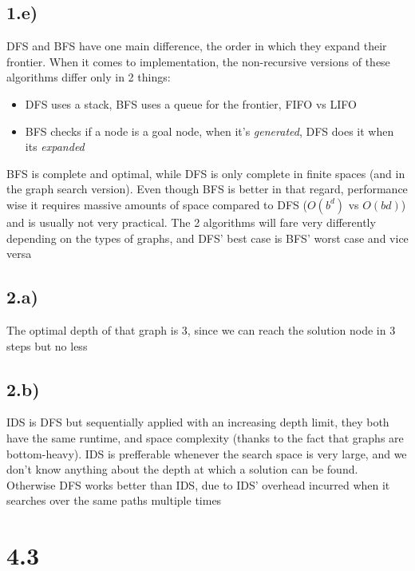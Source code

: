 \documentclass{report}
\begin{document}
\subsection*{1.e)}
DFS and BFS have one main difference, the order in which they expand their frontier. When it comes to implementation, the non-recursive versions of these algorithms differ only in 2 things: 
\begin{itemize}
    \item DFS uses a stack, BFS uses a queue for the frontier, FIFO vs LIFO
    \item BFS checks if a node is a goal node, when it's \emph{generated}, DFS does it when its \emph{expanded}
\end{itemize}
BFS is complete and optimal, while DFS is only complete in finite spaces (and in the graph search version).
Even though BFS is better in that regard, performance wise it requires massive amounts of space compared to DFS ($O(b^{d})$ vs $O(bd)$) and is usually not very practical. The 2 algorithms will fare very differently depending on the types of graphs, and DFS' best case is BFS' worst case and vice versa\par
\subsection*{2.a)}
The optimal depth of that graph is 3, since we can reach the solution node in 3 steps but no less
\subsection*{2.b)}
IDS is DFS but sequentially applied with an increasing depth limit, they both have the same runtime, and space complexity (thanks to the fact that graphs are bottom-heavy). IDS is prefferable whenever the search space is very large, and we don't know anything about the depth at which a solution can be found. Otherwise DFS works better than IDS, due to IDS' overhead incurred when it searches over the same paths multiple times
\section*{4.3}
\end{document}
